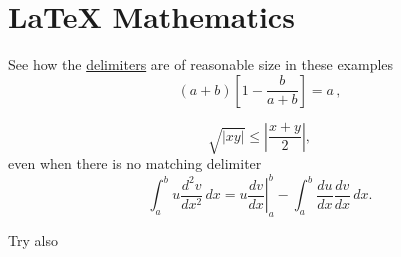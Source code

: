 \section{LaTeX Mathematics}
\label{sec:latexmath}
See how the \href{http://del.com}{delimiters} are of reasonable size in these examples
\begin{equation}
\label{eq:del1}
	\left(a+b\right)\left[1-\frac{b}{a+b}\right]=a\,,
\end{equation}

\[
	\sqrt{|xy|}\leq\left|\frac{x+y}{2}\right|,
\]
even when there is no matching delimiter
\[
	\int_a^bu\frac{d^2v}{dx^2}\,dx
	=\left.u\frac{dv}{dx}\right|_a^b
	-\int_a^b\frac{du}{dx}\frac{dv}{dx}\,dx.
\]

Try also 